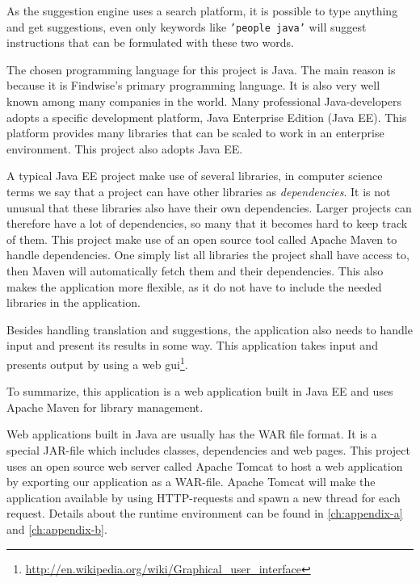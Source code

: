 As the suggestion engine uses a search platform, it is possible to type anything and get suggestions, even only keywords like \texttt{'people java'} will suggest instructions that can be formulated with these two words.

The chosen programming language for this project is Java. The main reason is because it is Findwise's primary programming language. It is also very well known among many companies in the world.
Many professional Java-developers adopts a specific development platform, Java Enterprise Edition (Java EE). This platform provides many libraries that can be scaled to work in an enterprise environment. This project also adopts Java EE.

A typical Java EE project make use of several libraries, in computer science terms we say that a project can have other libraries as \emph{dependencies}. It is not unusual that these libraries also have their own dependencies. Larger projects can therefore have a lot of dependencies, so many that it becomes hard to keep track of them. This project make use of an open source tool called Apache Maven to handle dependencies. One simply list all libraries the project shall have access to, then Maven will automatically fetch them and their dependencies. This also makes the application more flexible, as it do not have to include the needed libraries in the application.

Besides handling translation and suggestions, the application also needs to handle input and present its results in some way. This application takes input and presents output by using a web gui\footnote{\url{http://en.wikipedia.org/wiki/Graphical_user_interface}}.

To summarize, this application is a web application built in Java EE and uses Apache Maven for library management.

Web applications built in Java are usually has the WAR file format. It is a special JAR-file which includes classes, dependencies and web pages. This project uses an open source web server called Apache Tomcat to host a web application by exporting our application as a WAR-file. Apache Tomcat will make the application available by using HTTP-requests and spawn a new thread for each request.
\newline
\newline
Details about the runtime environment can be found in \autoref{ch:appendix-a} and \autoref{ch:appendix-b}.

